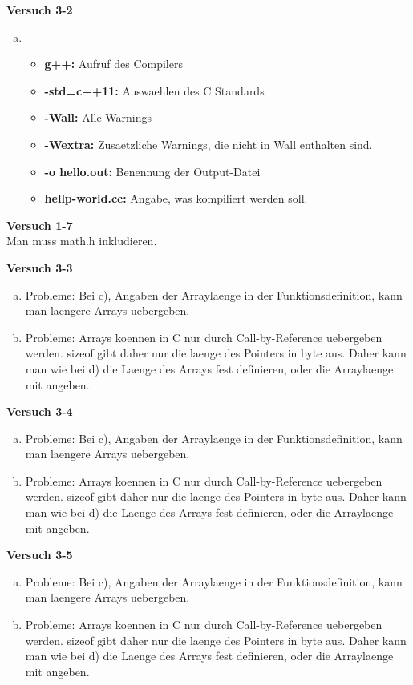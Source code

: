 \documentclass[german,10pt,oneside, fleqn, a4paper]{article}
\begin{document}
{\bf Versuch 3-2} \\[2ex]
\begin{enumerate}[b)]
	\item 
		\begin{itemize}
			\item {\bf{g++:}} Aufruf des Compilers
			\item {\bf{-std=c++11:}} Auswaehlen des C Standards
			\item {\bf{-Wall:}} Alle Warnings
			\item {\bf{-Wextra:}} Zusaetzliche Warnings, die nicht in Wall enthalten sind.
			\item {\bf{-o hello.out:}} Benennung der Output-Datei
			\item {\bf{hellp-world.cc:}} Angabe, was kompiliert werden soll.
		\end{itemize}
\end{enumerate}

{\bf Versuch 1-7} \\[2ex]
Man muss math.h inkludieren.


{\bf Versuch 3-3} \\[2ex]
\begin{enumerate}[a)]
	\item Probleme: Bei c), Angaben der Arraylaenge in der Funktionsdefinition, kann man laengere Arrays uebergeben.
	 \item Probleme: Arrays koennen in C nur durch Call-by-Reference uebergeben werden. sizeof gibt daher nur die laenge des Pointers in byte aus.
	 Daher kann man wie bei d) die Laenge des Arrays fest definieren, oder die Arraylaenge mit angeben.
\end{enumerate}


{\bf Versuch 3-4} \\[2ex]
\begin{enumerate}[a)]
	\item Probleme: Bei c), Angaben der Arraylaenge in der Funktionsdefinition, kann man laengere Arrays uebergeben.
	 \item Probleme: Arrays koennen in C nur durch Call-by-Reference uebergeben werden. sizeof gibt daher nur die laenge des Pointers in byte aus.
	 Daher kann man wie bei d) die Laenge des Arrays fest definieren, oder die Arraylaenge mit angeben.

\end{enumerate}

{\bf Versuch 3-5} \\[2ex]
\begin{enumerate}[a)]
	\item Probleme: Bei c), Angaben der Arraylaenge in der Funktionsdefinition, kann man laengere Arrays uebergeben.
	 \item Probleme: Arrays koennen in C nur durch Call-by-Reference uebergeben werden. sizeof gibt daher nur die laenge des Pointers in byte aus.
	 Daher kann man wie bei d) die Laenge des Arrays fest definieren, oder die Arraylaenge mit angeben.

\end{enumerate}
\end{document}
